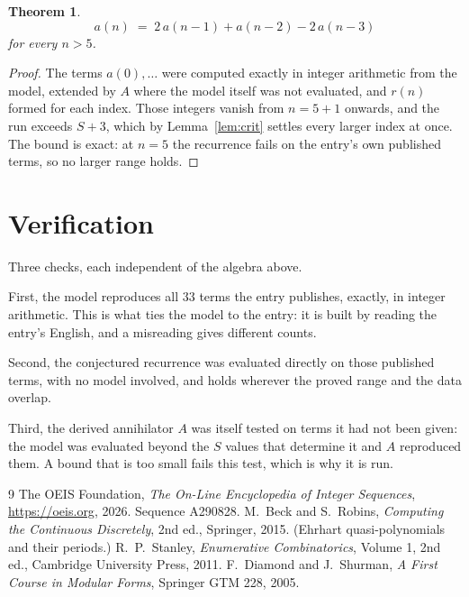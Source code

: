 \documentclass[11pt,a4paper]{article}
\theoremstyle{plain}
\newtheorem{theorem}{Theorem}
\theoremstyle{definition}
\begin{document}
\begin{theorem}
\[
a(n)\;=\;2\,a(n-1) + a(n-2) - 2\,a(n-3)
\]
for every $n>5$.
\end{theorem}

\begin{proof}
The terms $a(0),\dots$ were computed exactly in integer arithmetic from the model, extended by
$A$ where the model itself was not evaluated, and $r(n)$ formed for each index. Those integers
vanish from $n=5+1$ onwards, and the run exceeds $S+3$, which by
Lemma~\ref{lem:crit} settles every larger index at once. The bound is exact: at $n=5$ the recurrence fails on the entry's own published terms, so no larger range holds.
\end{proof}

\section{Verification}

Three checks, each independent of the algebra above.

First, the model reproduces all $33$ terms the entry publishes, exactly, in integer
arithmetic. This is what ties the model to the entry: it is built by reading the entry's
English, and a misreading gives different counts.

Second, the conjectured recurrence was evaluated directly on those published terms, with no
model involved, and holds wherever the proved range and the data overlap.

Third, the derived annihilator $A$ was itself tested on terms it had not been given: the model
was evaluated beyond the $S$ values that determine it and $A$ reproduced them. A bound that is
too small fails this test, which is why it is run.

\begin{thebibliography}{9}
 The OEIS Foundation, \emph{The On-Line Encyclopedia of Integer
Sequences}, \url{https://oeis.org}, 2026. Sequence A290828.
 M.~Beck and S.~Robins, \emph{Computing the Continuous Discretely},
2nd ed., Springer, 2015. (Ehrhart quasi-polynomials and their periods.)
 R.~P.~Stanley, \emph{Enumerative Combinatorics}, Volume 1, 2nd ed.,
Cambridge University Press, 2011.
 F.~Diamond and J.~Shurman, \emph{A First Course in Modular Forms},
Springer GTM 228, 2005.
\end{thebibliography}
\end{document}
